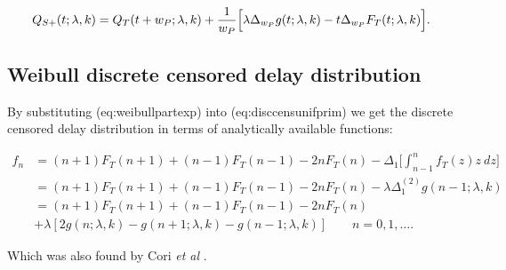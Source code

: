 \documentclass[10pt,letterpaper]{article}
\begin{document}
\begin{equation}
Q_{S+}(t ;\lambda,k) = Q_T(t + w_P; \lambda,k) + { 1 \over w_P} \Big[ \lambda \Delta_{w_P} g(t; \lambda,k) - t\Delta_{w_P}F_T(t; \lambda,k)\Big].
\end{equation}

\subsection{Weibull discrete censored delay distribution}

By substituting \@ref(eq:weibullpartexp) into \@ref(eq:disccensunifprim) we get the discrete censored delay distribution in terms of analytically available functions:

\begin{equation}
\begin{aligned}
f_n &= (n+1)F_T(n+1)  + (n-1)F_T(n-1) - 2nF_T(n) - \Delta_1\Big[ \int_{n-1}^n f_T(z) z ~dz \Big] \\
&= (n+1)F_T(n+1)  + (n-1)F_T(n-1) - 2nF_T(n) - \lambda \Delta_1^{(2)} g(n-1; \lambda,k) \\
&= (n+1)F_T(n+1)  + (n-1)F_T(n-1) - 2nF_T(n) \\
&+ \lambda [2 g(n; \lambda,k) - g(n+1; \lambda,k) - g(n-1; \lambda,k)] \qquad n = 0, 1, \dots.
\end{aligned}
\end{equation}

Which was also found by Cori \textit{et al} \cite{Cori2013}.
\end{document}
